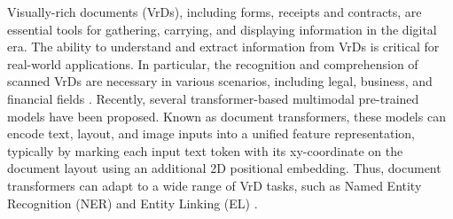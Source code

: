 \documentclass[11pt]{article}
\begin{document}
Visually-rich documents (VrDs), including forms, receipts and contracts, are essential tools for gathering, carrying, and displaying information in the digital era.
The ability to understand and extract information from VrDs is critical for real-world applications.
In particular, the recognition and comprehension of scanned VrDs are necessary in various scenarios, including legal, business, and financial fields \citep{stanislawek2021kleister, huang2019icdar2019, stray2020deepform}.
Recently, several transformer-based multimodal pre-trained models \citep{Garncarek2020LAMBERTLL,xu2021layoutlmv2,li2021structurallm,hong2022bros,huang2022layoutlmv3,tu2023layoutmask} have been proposed. Known as document transformers, these models can encode text, layout, and image inputs into a unified feature representation, typically by marking each input text token with its xy-coordinate on the document layout using an additional 2D positional embedding. Thus, document transformers can adapt to a wide range of VrD tasks, such as Named Entity Recognition (NER) and Entity Linking (EL) \citep{jaume2019funsd,park2019cord}. 
\end{document}
